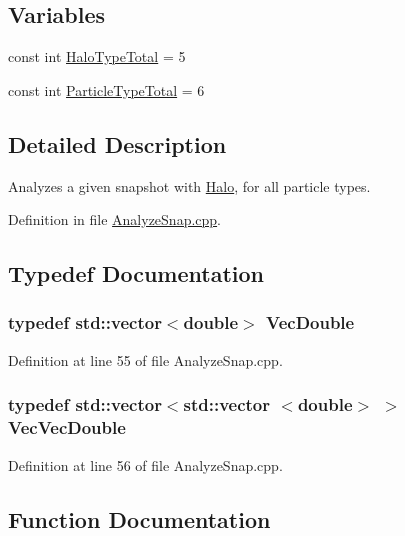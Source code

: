 \subsection*{Variables}
\begin{DoxyCompactItemize}
\item 
const int \hyperlink{AnalyzeSnap_8cpp_a8473fa3d28febd7487db0967e19fc5bf}{HaloTypeTotal} = 5
\item 
const int \hyperlink{AnalyzeSnap_8cpp_a26cdc03eddc01de73d2183283e42f8ca}{ParticleTypeTotal} = 6
\end{DoxyCompactItemize}


\subsection{Detailed Description}
Analyzes a given snapshot with \hyperlink{classHalo}{Halo}, for all particle types. 

Definition in file \hyperlink{AnalyzeSnap_8cpp_source}{AnalyzeSnap.cpp}.



\subsection{Typedef Documentation}
\subsubsection[{VecDouble}]{\setlength{\rightskip}{0pt plus 5cm}typedef std::vector$<$double$>$ {\bf VecDouble}}\label{AnalyzeSnap_8cpp_a00624963fadb9859c2785372d78dbf7d}


Definition at line 55 of file AnalyzeSnap.cpp.

\subsubsection[{VecVecDouble}]{\setlength{\rightskip}{0pt plus 5cm}typedef std::vector$<$std::vector $<$double$>$ $>$ {\bf VecVecDouble}}\label{AnalyzeSnap_8cpp_a19eaba2936536c4981d32fb3556862a5}


Definition at line 56 of file AnalyzeSnap.cpp.



\subsection{Function Documentation}
